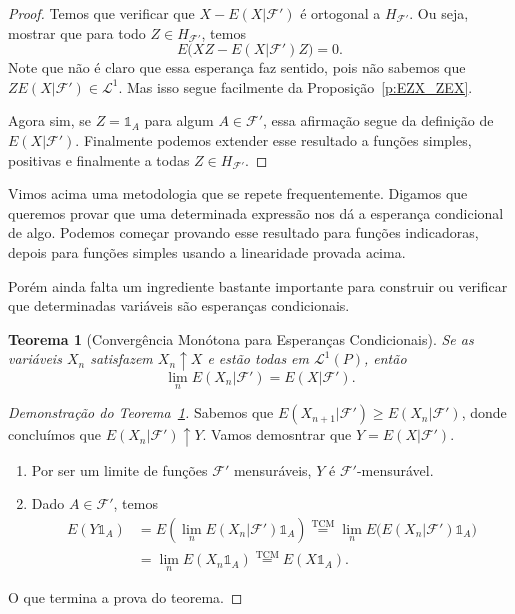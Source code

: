 \documentclass[reqno, final]{book}
\newcommand*\1{\mathds{1}}
\newtheorem{theorem}{Teorema}[section]
\begin{document}
\begin{proof}
  Temos que verificar que $X - E(X|\mathcal{F}')$ é ortogonal a $H_{\mathcal{F}'}$.
  Ou seja, mostrar que para todo $Z \in H_{\mathcal{F}'}$, temos
  \begin{equation}
    E\big( XZ - E(X|\mathcal{F}') Z \big) = 0.
  \end{equation}
  Note que não é claro que essa esperança faz sentido, pois não sabemos que $ZE(X|\mathcal{F}') \in \mathcal{L}^1$.
  Mas isso segue facilmente da Proposição~\ref{p:EZX_ZEX}.

  Agora sim, se $Z = \1_{A}$ para algum $A \in \mathcal{F}'$, essa afirmação segue da definição de $E(X|\mathcal{F}')$.
  Finalmente podemos extender esse resultado a funções simples, positivas e finalmente a todas $Z \in H_{\mathcal{F}'}$.
\end{proof}

Vimos acima uma metodologia que se repete frequentemente.
Digamos que queremos provar que uma determinada expressão nos dá a esperança condicional de algo.
Podemos começar provando esse resultado para funções indicadoras, depois para funções simples usando a linearidade provada acima.

Porém ainda falta um ingrediente bastante importante para construir ou verificar que determinadas variáveis são esperanças condicionais.

\begin{theorem}[Convergência Monótona para Esperanças Condicionais]
  \label{t:TCM_EC}
  Se as variáveis $X_n$ satisfazem $X_n \uparrow X$ e estão todas em $\mathcal{L}^1(P)$, então
  \begin{equation}
    \lim_n E(X_n|\mathcal{F}') = E(X|\mathcal{F}').
  \end{equation}
\end{theorem}

\begin{proof}[Demonstração do Teorema~\ref{t:TCM_EC}]
  Sabemos que $E(X_{n+1} | \mathcal{F}') \geq E(X_n|\mathcal{F}')$, donde concluímos que $E(X_n|\mathcal{F}') \uparrow Y$.
  Vamos demosntrar que $Y = E(X|\mathcal{F}')$.
  \begin{enumerate}[\quad a)]
  \item Por ser um limite de funções $\mathcal{F}'$ mensuráveis, $Y$ é $\mathcal{F}'$-mensurável.
  \item Dado $A \in \mathcal{F}'$, temos
    \begin{equation}
      \begin{split}
        E(Y \1_A) & = E(\lim_n E(X_n |\mathcal{F}') \1_A) \overset{\text{TCM}}= \lim_n E\big( E(X_n|\mathcal{F}') \1_A \big)\\
        & = \lim_n E(X_n \1_A) \overset{\text{TCM}}= E(X \1_A).
      \end{split}
    \end{equation}
  \end{enumerate}
  O que termina a prova do teorema.
\end{proof}
\end{document}
